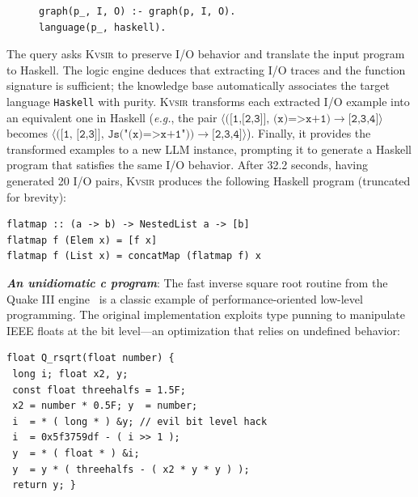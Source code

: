 \documentclass[nonacm,sigplan,review]{acmart}
\def\eg{{\em e.g.}, }
\newcommand{\sys}{{\scshape Kv{\textalpha}sir}\xspace}
\newcommand{\heading}[1]{\vspace{2pt}\noindent\textbf{\emph{#1}}:\enspace}
\begin{document}
\begin{figure}
\begin{verbatim}
graph(p_, I, O) :- graph(p, I, O).
language(p_, haskell).
\end{verbatim}
\end{figure}
The query asks \sys to preserve I/O behavior and translate the input program to Haskell.
The logic engine deduces that extracting I/O traces and the function signature is
sufficient; the knowledge base automatically associates the target language
\texttt{Haskell} with purity.
\sys transforms each extracted I/O example into an equivalent one in Haskell (\eg 
the pair $\langle\texttt{([1,[2,3]], (x)=>x+1)}\to\texttt{[2,3,4]}\rangle$ 
becomes $\langle(\texttt{[1, [2,3]], Js("(x)=>x+1"))}\to\texttt{[2,3,4]}\rangle$).
Finally, it provides the transformed examples to a new LLM instance, prompting it
to generate a Haskell program that satisfies the same I/O behavior.
After 32.2 seconds, having generated 20 I/O pairs, \sys produces the following
Haskell program (truncated for brevity):
\begin{verbatim}
flatmap :: (a -> b) -> NestedList a -> [b]
flatmap f (Elem x) = [f x]
flatmap f (List x) = concatMap (flatmap f) x
\end{verbatim}

\heading{An unidiomatic c program}
The fast inverse square root routine from the Quake III
engine~\cite{fast_inv_sqrt}
is a classic example of performance-oriented low-level programming.
The original implementation exploits type punning to manipulate IEEE
floats at the bit level---an optimization that relies on undefined behavior:

\begin{verbatim}
float Q_rsqrt(float number) {
 long i; float x2, y;
 const float threehalfs = 1.5F;
 x2 = number * 0.5F; y  = number;
 i  = * ( long * ) &y; // evil bit level hack
 i  = 0x5f3759df - ( i >> 1 );
 y  = * ( float * ) &i;
 y  = y * ( threehalfs - ( x2 * y * y ) );
 return y; }
\end{verbatim}
\end{document}
